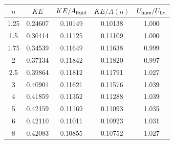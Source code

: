 \begin{tabular}{@{}ccccc@{}}
\toprule
$n$ & $KE$ & $KE/A_{\rm fluid}$ & $KE/A(n)$ & $U_{\max}/U_{\rm lid}$ \\
\midrule
1.25 & 0.24607 & 0.10149 & 0.10138 & 1.000 \\
1.5 & 0.30414 & 0.11125 & 0.11109 & 1.000 \\
1.75 & 0.34539 & 0.11649 & 0.11638 & 0.999 \\
2 & 0.37134 & 0.11842 & 0.11820 & 0.997 \\
2.5 & 0.39864 & 0.11812 & 0.11791 & 1.027 \\
3 & 0.40901 & 0.11621 & 0.11576 & 1.039 \\
4 & 0.41859 & 0.11352 & 0.11288 & 1.039 \\
5 & 0.42159 & 0.11169 & 0.11093 & 1.035 \\
6 & 0.42110 & 0.11011 & 0.10923 & 1.031 \\
8 & 0.42083 & 0.10855 & 0.10752 & 1.027 \\
\bottomrule
\end{tabular}